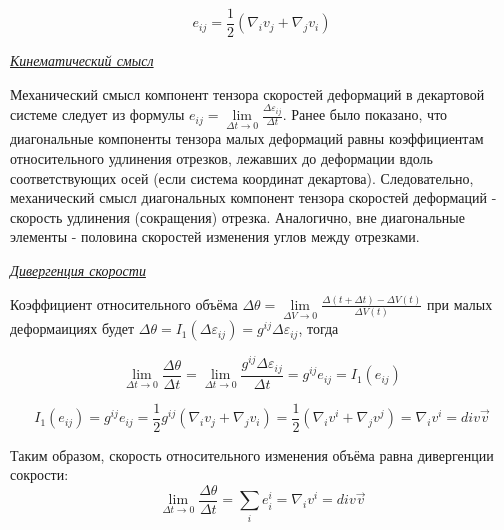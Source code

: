 $$e_{ij} = \frac{1}{2} \left(\nabla_{i}v_{j} + \nabla_{j}v_{i}\right)$$

\begin{center}
  \textit{\underline{Кинематический смысл}}
\end{center}
Механический смысл компонент тензора скоростей деформаций в декартовой системе следует из формулы $e_{ij} = \lim\limits_{\Delta t \rightarrow 0} \frac{\Delta \varepsilon_{ij}}{\Delta t}$. Ранее было показано, что диагональные компоненты тензора малых деформаций равны коэффициентам относительного удлинения отрезков, лежавших до деформации вдоль соответствующих осей (если система координат декартова). Следовательно, механический смысл диагональных компонент тензора скоростей деформаций - скорость удлинения (сокращения) отрезка. Аналогично, вне диагональные элементы - половина скоростей изменения углов между отрезками.

\begin{center}
  \textit{\underline{Дивергенция скорости}}
\end{center}

Коэффициент относительного объёма
$ \Delta \theta = \lim\limits_{\Delta V \rightarrow 0} \frac {\Delta (t + \Delta t) - \Delta V(t)}{\Delta V(t)} $
при малых деформаициях будет $ \Delta \theta = I_1 (\Delta \varepsilon_{ij}) = g^{ij} \Delta \varepsilon_{ij} $, тогда

$$ \lim\limits_{\Delta t \rightarrow 0} \frac{\Delta \theta}{\Delta t} = \lim\limits_{\Delta t \rightarrow 0} \frac{g^{ij} \Delta \varepsilon_{ij}}{\Delta t} = g^{ij} e_{ij} = I_1 (e_{ij}) $$

$$ I_1 (e_{ij}) =  g^{ij} e_{ij} = \frac{1}{2} g^{ij} \left(\nabla_{i}v_{j} + \nabla_{j}v_{i}\right) = \frac{1}{2} \left(\nabla_{i}v^{i} + \nabla_{j}v^{j}\right) = \nabla_{i}v^{i} = div \overrightarrow{v}$$

Таким образом, скорость относительного изменения объёма равна дивергенции сокрости:
$$ \lim\limits_{\Delta t \rightarrow 0} \frac{\Delta \theta}{\Delta t} = \sum\limits_{i} e^{i}_{i} = \nabla_{i}v^{i} = div \overrightarrow{v}$$
